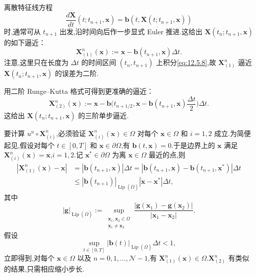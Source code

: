 离散特征线方程
\begin{equation}\label{eq:12.5.8}
  \frac{d\boldsymbol{X}}{dt}(t;t_{n+1},\boldsymbol{x})
    =\boldsymbol{b}(t,\boldsymbol{X}(t;t_{n+1},\boldsymbol{x}))
\end{equation}
时,通常可从 \(t_{n+1}\) 出发,沿时间向后作一步显式 Euler 推进.这给出 \(\boldsymbol{X}(t_n;t_{n+1},\boldsymbol{x})\) 的如下逼近：
\begin{equation}\label{eq:12.5.9}
  \boldsymbol{X}_{(1)}^n(\boldsymbol{x}):=\boldsymbol{x}-\boldsymbol{b}(t_{n+1},\boldsymbol{x})\Delta t.
\end{equation}
注意,这里只在长度为 \(\Delta t\) 的时间区间 \((t_n,t_{n+1})\) 上积分\eqref{eq:12.5.8},故 \(\boldsymbol{X}_{(1)}^n\) 逼近 \(\boldsymbol{X}(t_n;t_{n+1},\boldsymbol{x})\) 的误差为二阶.

用二阶 Runge--Kutta 格式可得到更准确的逼近：
\begin{equation}\label{eq:12.5.10}
  \boldsymbol{X}_{(2)}^n(\boldsymbol{x}):=\boldsymbol{x}-\boldsymbol{b}\biggl(
     t_{n+1/2},\boldsymbol{x}-\boldsymbol{b}(t_{n+1},\boldsymbol{x})\frac{\Delta t}{2}\biggr)\Delta t.
\end{equation}
这给出 \(\boldsymbol{X}(t_n;t_{n+1},\boldsymbol{x})\) 的三阶单步逼近.

要计算 \(u^n\circ\boldsymbol{X}_{(i)}^n\),必须验证 \(\boldsymbol{X}_{(i)}^n(\boldsymbol{x})\in\Omega\) 对每个 \(\boldsymbol{x}\in\Omega\) 和 \(i=1,2\) 成立.为简便起见,假设对每个 \(t\in[0,T]\) 和 \(\boldsymbol{x}\in\partial\Omega\),有 \(\boldsymbol{b}(t,\boldsymbol{x})=0\).于是边界上的 \(\boldsymbol{x}\) 满足 \(\boldsymbol{X}_{(i)}^n(\boldsymbol{x})=\boldsymbol{x}\),\(i=1,2\).记 \(\boldsymbol{x}^*\in\partial\Omega\) 为离 \(\boldsymbol{x}\in\Omega\) 最近的点,则
\[
  \begin{aligned}
    |\boldsymbol{X}_{(1)}^n(\boldsymbol{x})-\boldsymbol{x}|
      &=|\boldsymbol{b}(t_{n+1},\boldsymbol{x})|\Delta t
        =|\boldsymbol{b}(t_{n+1},\boldsymbol{x})-\boldsymbol{b}(t_{n+1},\boldsymbol{x}^*)|\Delta t\\
      &\le|\boldsymbol{b}(t_{n+1})|_{\operatorname{Lip}(\overline\Omega)}
               |\boldsymbol{x}-\boldsymbol{x}^*|\Delta t,
  \end{aligned}
\]
其中
\[
  |\boldsymbol{g}|_{\operatorname{Lip}(\overline\Omega)}
    :=\sup_{\substack{\boldsymbol{x}_1,\boldsymbol{x}_2\in\overline\Omega\\\boldsymbol{x}_1\ne\boldsymbol{x}_2}}
         \frac{|\boldsymbol{g}(\boldsymbol{x}_1)-\boldsymbol{g}(\boldsymbol{x}_2)|}{|\boldsymbol{x}_1-\boldsymbol{x}_2|}.
\]
假设
\begin{equation}\label{eq:12.5.11}
  \sup_{t\in[0,T]}|\boldsymbol{b}(t)|_{\operatorname{Lip}(\overline\Omega)}\Delta t<1,
\end{equation}
立即得到,对每个 \(\boldsymbol{x}\in\Omega\) 以及 \(n=0,1,\ldots,\mathcal N-1\),有 \(\boldsymbol{X}_{(1)}^n(\boldsymbol{x})\in\Omega\).\(\boldsymbol{X}_{(2)}^n\) 有类似的结果,只需相应缩小步长.

